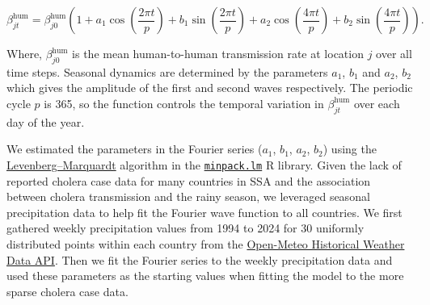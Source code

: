 \documentclass[
]{book}
\begin{document}
\begin{equation}
\beta_{jt}^{\text{hum}} = \beta_{j0}^{\text{hum}} \left(1 + a_1 \cos\left(\frac{2\pi t}{p}\right) + b_1 \sin\left(\frac{2\pi t}{p}\right) + a_2 \cos\left(\frac{4\pi t}{p}\right) + b_2 \sin\left(\frac{4\pi t}{p}\right)\right).
\label{eq:beta1}
\end{equation}

Where, \(\beta_{j0}^{\text{hum}}\) is the mean human-to-human transmission rate at location \(j\) over all time steps. Seasonal dynamics are determined by the parameters \(a_1\), \(b_1\) and \(a_2\), \(b_2\) which gives the amplitude of the first and second waves respectively. The periodic cycle \(p\) is 365, so the function controls the temporal variation in \(\beta_{jt}^{\text{hum}}\) over each day of the year.

We estimated the parameters in the Fourier series (\(a_1\), \(b_1\), \(a_2\), \(b_2\)) using the \href{https://en.wikipedia.org/wiki/Levenberg\%E2\%80\%93Marquardt_algorithm}{Levenberg--Marquardt} algorithm in the \href{https://rdrr.io/cran/minpack.lm/}{\texttt{minpack.lm}} R library. Given the lack of reported cholera case data for many countries in SSA and the association between cholera transmission and the rainy season, we leveraged seasonal precipitation data to help fit the Fourier wave function to all countries. We first gathered weekly precipitation values from 1994 to 2024 for 30 uniformly distributed points within each country from the \href{https://open-meteo.com/en/docs/historical-weather-api}{Open-Meteo Historical Weather Data API}. Then we fit the Fourier series to the weekly precipitation data and used these parameters as the starting values when fitting the model to the more sparse cholera case data.
\end{document}
